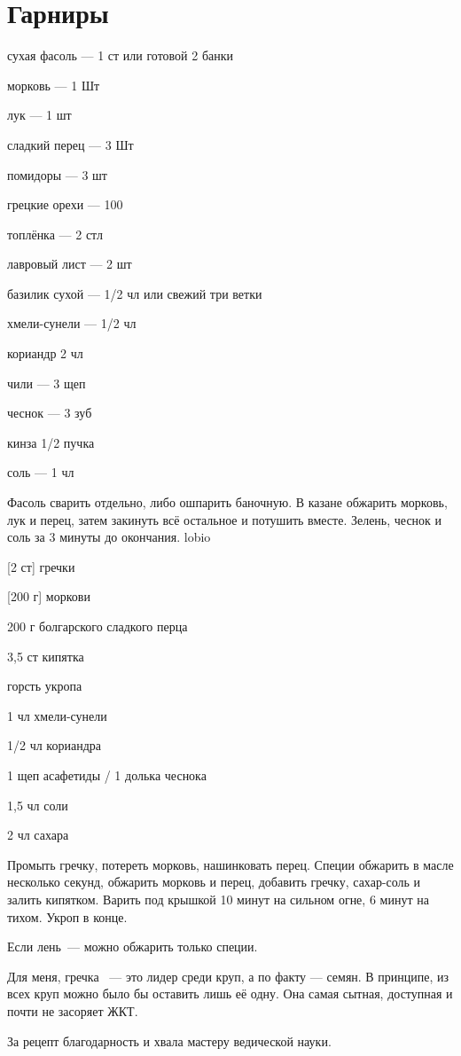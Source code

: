 \chapter*{Гарниры}
\label{sec:garnish}



{
\item сухая фасоль — 1 ст или готовой 2 банки
\item морковь — 1 Шт
\item лук — 1 шт
\item сладкий перец — 3 Шт
\item помидоры — 3 шт
\item грецкие орехи — 100 
\item топлёнка — 2 стл 
}{
\item лавровый лист — 2 шт
\item базилик сухой — 1/2 чл или свежий три ветки
\item хмели-сунели — 1/2 чл
\item кориандр 2 чл
\item чили — 3 щеп
\item чеснок — 3 зуб
\item кинза 1/2 пучка
\item соль — 1 чл
}{
Фасоль сварить отдельно, либо ошпарить баночную. В казане обжарить морковь, лук и перец, затем закинуть всё остальное и потушить вместе. Зелень, чеснок и соль за 3 минуты до окончания.
}{}{lobio}

{
\item{} [2 ст] гречки
\item{} [200 г] моркови
\item 200 г болгарского сладкого перца
\item 3,5 ст кипятка
\item горсть укропа
}{
\item 1 чл хмели-сунели
\item 1/2 чл кориандра
\item 1 щеп асафетиды / 1 долька чеснока
\item 1,5 чл соли
\item 2 чл сахара
}{
Промыть гречку, потереть морковь, нашинковать перец. Специи обжарить в масле несколько секунд, обжарить морковь и перец, добавить гречку, сахар-соль и залить кипятком. Варить под крышкой 10 минут на сильном огне, 6 минут на тихом. Укроп в конце.
}{
\begin{advice}
\item Если лень~--- можно обжарить только специи.
\item Для меня, гречка ~--- это лидер среди круп, а по факту — семян. В принципе, из всех круп можно было бы оставить лишь её одну. Она самая сытная, доступная и почти не засоряет ЖКТ. 
\item За рецепт благодарность и хвала мастеру ведической науки. 
\end{advice}}{}



